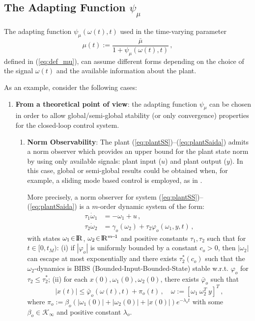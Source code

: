 \documentclass[letterpaper, 10 pt, conference]{ieeeconf}  %
\def\re{{\rm I}\! {\rm R}}
\theoremstyle{plain}
\theoremstyle{definition}
\theoremstyle{remark}
\begin{document}
\subsection{The Adapting Function $\psi_\mu$}

The adapting function $\psi_\mu(\omega(t),t)$ used in the time-varying parameter 
%
\begin{equation}
\mu(t):=\frac{\bar{\mu}}{1+
\psi_\mu(\omega(t),t)}\,,%
\end{equation}
%
defined in (\ref{eq:def_mu}), can assume different forms depending on the choice of the signal $\omega(t)$ and the available information about the plant. 

As an example, consider the following cases:
%
\begin{enumerate}

\item {\bf From a theoretical point of view}: the adapting function $\psi_\mu$ can be chosen in order to allow global/semi-global stability (or only convergence) properties for the closed-loop control system. 

\begin{enumerate}

\item {\bf Norm Observability}: The plant
(\ref{eq:plantSS})--(\ref{eq:plantSaida}) admits a norm observer which provides an upper bound for the plant state norm by using only  available signals: plant input ($u$) and plant output ($y$). In this case, global or semi-global results could be obtained when, for example, a sliding mode based control is employed, as in \cite{POH:2011}.  


More precisely, a norm observer for system
(\ref{eq:plantSS})--(\ref{eq:plantSaida})  is a $m$-order
dynamic system of the form:
%
\begin{align}
\tau_1 \dot{\omega}_1 &= -\omega_1+u\,, \label{eq:defuav} \\
\tau_2 \dot{\omega}_2 &=
\gamma_o(\omega_2)+\tau_2\varphi_o(\omega_1,y,t)\,,\label{eq:normobsgeneric}
\end{align}
%
with states $\omega_1\!\in\!\re$, $\omega_2\!\in\!\re^{m\!-\!1}$ and
positive constants $\tau_1, \tau_2$ such that for $t\in[0,t_M)$: (i)
if $|\varphi_o|$ is uniformly bounded by a constant $c_o\!>\!0$,
then $|\omega_2|$ can escape at most exponentially and there exists
$\tau_2^*(c_o)$ such that the $\omega_2$-dynamics is BIBS
(Bounded-Input-Bounded-State) stable w.r.t. $\varphi_o$ for
$\tau_2\leq \tau_2^*$; (ii)
for each $x(0),\omega_1(0),\omega_2(0)$, there exists $\bar{\varphi}_o$ such that
%
\begin{equation}
|x(t)| \leq \bar{\varphi}_o(\omega(t),t) + \pi_o(t) \,, \quad
\omega:=[\omega_1 \ \omega_2^T \ y]^T\,,\label{eq:xboundfromw}
\end{equation}
%
where
$\pi_o:=\beta_o(|\omega_1(0)|\!+\!|\omega_2(0)|\!+\!|x(0)|)e^{-\lambda_o
t}$ with some $\beta_o \in \mathcal{K}_\infty$ and positive
constant $\lambda_o$.


\end{enumerate}
\end{enumerate}
\end{document}
